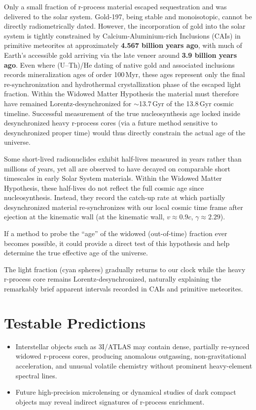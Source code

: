 \documentclass[12pt]{article}
\begin{document}
Only a small fraction of r-process material escaped sequestration and was delivered to the solar system. Gold-197, being stable and monoisotopic, cannot be directly radiometrically dated. However, the incorporation of gold into the solar system is tightly constrained by Calcium-Aluminium-rich Inclusions (CAIs) in primitive meteorites at approximately \textbf{4.567 billion years ago}, with much of Earth's accessible gold arriving via the late veneer around \textbf{3.9 billion years ago}. Even where (U--Th)/He dating of native gold and associated inclusions records mineralization ages of order 100\,Myr, these ages represent only the final re-synchronization and hydrothermal crystallization phase of the escaped light fraction. Within the Widowed Matter Hypothesis the material must therefore have remained Lorentz-desynchronized for $\sim$13.7\,Gyr of the 13.8\,Gyr cosmic timeline. Successful measurement of the true nucleosynthesis age locked inside desynchronized heavy r-process cores (via a future method sensitive to desynchronized proper time) would thus directly constrain the actual age of the universe.

Some short-lived radionuclides exhibit half-lives measured in years rather than millions of years, yet all are observed to have decayed on comparable short timescales in early Solar System materials. Within the Widowed Matter Hypothesis, these half-lives do not reflect the full cosmic age since nucleosynthesis. Instead, they record the catch-up rate at which partially desynchronized material re-synchronizes with our local cosmic time frame after ejection at the kinematic wall (at the kinematic wall, \(v \approx 0.9c\), \(\gamma \approx 2.29\)).

If a method to probe the ``age'' of the widowed (out-of-time) fraction ever becomes possible, it could provide a direct test of this hypothesis and help determine the true effective age of the universe.

The light fraction (cyan spheres) gradually returns to our clock while the heavy r-process core remains Lorentz-desynchronized, naturally explaining the remarkably brief apparent intervals recorded in CAIs and primitive meteorites.

\section{Testable Predictions}

\begin{itemize}
    \item Interstellar objects such as 3I/ATLAS may contain dense, partially re-synced widowed r-process cores, producing anomalous outgassing, non-gravitational acceleration, and unusual volatile chemistry without prominent heavy-element spectral lines.
    \item Future high-precision microlensing or dynamical studies of dark compact objects may reveal indirect signatures of r-process enrichment.
\end{itemize}
\end{document}
